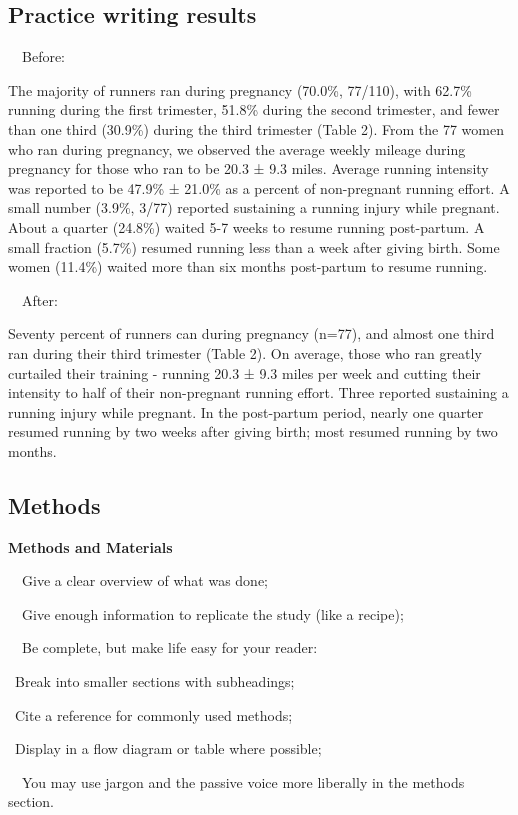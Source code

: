 \documentclass[a4paper, 12pt]{article}
\begin{document}
\newpage\subsection{Practice writing results}

\par\ \textbullet\ Before:
\par The majority of runners ran during pregnancy (70.0\%, 77/110),
with 62.7\% running during the first trimester,
51.8\% during the second trimester, and fewer than one third (30.9\%) during the third trimester (Table 2).
From the 77 women who ran during pregnancy, we observed the average weekly mileage during pregnancy for those who ran to be 20.3 ± 9.3 miles.
Average running intensity was reported to be 47.9\% ± 21.0\% as a percent of non-pregnant running effort.
A small number (3.9\%, 3/77) reported sustaining a running injury while pregnant. About a quarter (24.8\%) waited 5-7 weeks to resume running post-partum.
A small fraction (5.7\%) resumed running less than a week after giving birth. Some women (11.4\%) waited more than six months post-partum to resume running.

\par\ \textbullet\ After:
\par Seventy percent of runners can during pregnancy (n=77), and almost one third ran during their third trimester (Table 2).
On average, those who ran greatly curtailed their training - running 20.3 ± 9.3 miles per week and cutting their intensity to half of their non-pregnant running effort.
Three reported sustaining a running injury while pregnant. In the post-partum period, nearly one quarter resumed running by two weeks after giving birth;
most resumed running by two months.

\newpage\subsection{Methods}

\textbf{Methods and Materials}
\par\ \textbullet\ Give a clear overview of what was done;
\par\ \textbullet\ Give enough information to replicate the study (like a recipe);
\par\ \textbullet\ Be complete, but make life easy for your reader:
\par\quad\textopenbullet\ Break into smaller sections with subheadings;
\par\quad\textopenbullet\ Cite a reference for commonly used methods;
\par\quad\textopenbullet\ Display in a flow diagram or table where possible;
\par\ \textbullet\ You may use jargon and the passive voice more liberally in the methods section.
\end{document}
